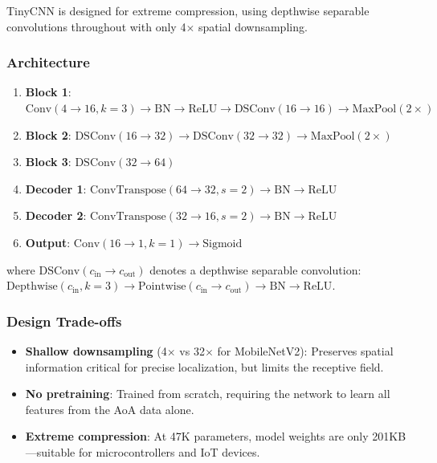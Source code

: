 \documentclass[11pt,a4paper]{article}
\begin{document}
TinyCNN is designed for extreme compression, using depthwise separable convolutions throughout with only 4$\times$ spatial downsampling.

\subsubsection{Architecture}

\begin{enumerate}[leftmargin=*]
    \item \textbf{Block 1}: $\text{Conv}(4 \to 16, k{=}3) \to \text{BN} \to \text{ReLU} \to \text{DSConv}(16 \to 16) \to \text{MaxPool}(2\times)$
    \item \textbf{Block 2}: $\text{DSConv}(16 \to 32) \to \text{DSConv}(32 \to 32) \to \text{MaxPool}(2\times)$
    \item \textbf{Block 3}: $\text{DSConv}(32 \to 64)$
    \item \textbf{Decoder 1}: $\text{ConvTranspose}(64 \to 32, s{=}2) \to \text{BN} \to \text{ReLU}$
    \item \textbf{Decoder 2}: $\text{ConvTranspose}(32 \to 16, s{=}2) \to \text{BN} \to \text{ReLU}$
    \item \textbf{Output}: $\text{Conv}(16 \to 1, k{=}1) \to \text{Sigmoid}$
\end{enumerate}

where $\text{DSConv}(c_\text{in} \to c_\text{out})$ denotes a depthwise separable convolution: $\text{Depthwise}(c_\text{in}, k{=}3) \to \text{Pointwise}(c_\text{in} \to c_\text{out}) \to \text{BN} \to \text{ReLU}$.

\subsubsection{Design Trade-offs}
\begin{itemize}[leftmargin=*]
    \item \textbf{Shallow downsampling} (4$\times$ vs 32$\times$ for MobileNetV2): Preserves spatial information critical for precise localization, but limits the receptive field.
    \item \textbf{No pretraining}: Trained from scratch, requiring the network to learn all features from the AoA data alone.
    \item \textbf{Extreme compression}: At 47K parameters, model weights are only 201KB---suitable for microcontrollers and IoT devices.
\end{itemize}

\end{document}
